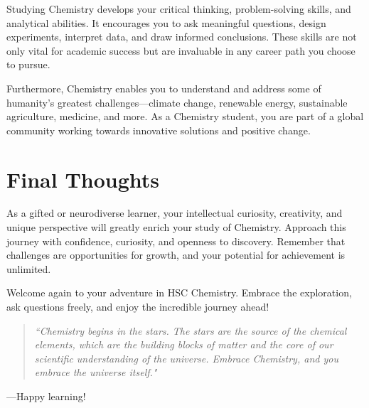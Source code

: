 
Studying Chemistry develops your critical thinking, problem-solving skills, and analytical abilities. It encourages you to ask meaningful questions, design experiments, interpret data, and draw informed conclusions. These skills are not only vital for academic success but are invaluable in any career path you choose to pursue.

Furthermore, Chemistry enables you to understand and address some of humanity's greatest challenges—climate change, renewable energy, sustainable agriculture, medicine, and more. As a Chemistry student, you are part of a global community working towards innovative solutions and positive change.

\section{Final Thoughts}
\FloatBarrier
\FloatBarrier
\FloatBarrier

As a gifted or neurodiverse learner, your intellectual curiosity, creativity, and unique perspective will greatly enrich your study of Chemistry. Approach this journey with confidence, curiosity, and openness to discovery. Remember that challenges are opportunities for growth, and your potential for achievement is unlimited.

Welcome again to your adventure in HSC Chemistry. Embrace the exploration, ask questions freely, and enjoy the incredible journey ahead!

\vspace{1cm}

\begin{quote}
\textit{``Chemistry begins in the stars. The stars are the source of the chemical elements, which are the building blocks of matter and the core of our scientific understanding of the universe. Embrace Chemistry, and you embrace the universe itself."}
\end{quote}

\vspace{1cm}

—Happy learning!
